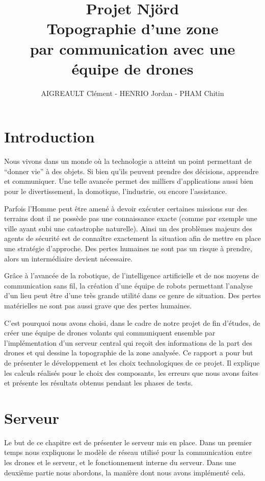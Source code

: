 \documentclass[a4paper,10pt]{report}
\title{\textbf{Projet Njörd}\\ Topographie d'une zone \\ par communication avec 
une équipe de drones}
\author{AIGREAULT Clément - HENRIO Jordan - PHAM Chitin}
\begin{document}
  \maketitle

  \chapter*{Introduction}
    Nous vivons dans un monde où la technologie a atteint un point permettant 
de “donner vie” à des objets. Si bien qu’ils peuvent prendre des décisions, 
apprendre et communiquer. Une telle avancée permet des milliers d’applications 
aussi bien pour le divertissement, la domotique, l’industrie, ou encore 
l’assistance.
    
    Parfois l’Homme peut être amené à devoir exécuter certaines missions sur 
des terrains dont il ne possède pas une connaissance exacte (comme par exemple 
une ville ayant subi une catastrophe naturelle). Ainsi un des problèmes majeurs 
des agents de sécurité est de connaître exactement la situation afin de mettre 
en place une stratégie d’approche. Des pertes humaines ne sont pas un risque à 
prendre, alors un intermédiaire devient nécessaire. 

    Grâce à l'avancée de la robotique, de l'intelligence artificielle et de nos 
moyens de communication sans fil, la création d’une équipe de robots permettant 
l’analyse d’un lieu peut être d’une très grande utilité dans ce genre de 
situation. Des pertes matérielles ne sont pas aussi grave que des pertes 
humaines. 

  C'est pourquoi nous avons choisi, dans le cadre de notre projet de fin 
d'études, de créer une équipe de drones volants qui communiquent ensemble par 
l'implémentation d'un serveur central qui reçoit des informations de la part 
des drones et qui dessine la topographie de la zone analysée. Ce rapport a pour 
but de présenter le développement et les choix technologiques de ce projet. Il 
explique les calculs réalisés pour le choix des composants, les erreurs que 
nous avons faites et présente les résultats obtenus pendant les phases de tests.
  
  \tableofcontents
  
  \chapter{Serveur}
    Le but de ce chapitre est de présenter le serveur mis en place. Dans un 
premier temps nous expliquons le modèle de réseau utilisé pour la communication 
entre les drones et le serveur, et le fonctionnement interne du serveur. Dans 
une deuxième partie nous abordons, la manière dont nous avons implémenté cela.
\end{document}
